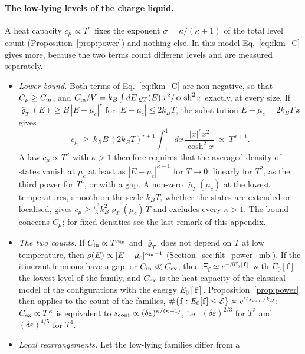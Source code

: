 \documentclass[10pt,a4paper]{article}
\theoremstyle{plain}
\newcommand{\enrg}{\mathcal{E}}  %
\begin{document}
\paragraph{The low-lying levels of the charge liquid.} A heat capacity
$c_\mu\propto T^{\kappa}$ fixes the exponent $\sigma=\kappa/(\kappa+1)$ of
the total level count (Proposition~\ref{prop:power}) and nothing else. In
this model Eq.~\eqref{eq:fkm_C} gives more, because the two terms count
different levels and are measured separately.
\begin{itemize}\setlength{\itemsep}{2pt}
\item \emph{Lower bound.} Both terms of Eq.~\eqref{eq:fkm_C} are
  non-negative, so that $C_\mu\ge C_{\rm in}$, and
  $C_{\rm in}/V=k_B\int dE\,\bar\varrho_T(E)\,x^{2}/\cosh^{2}x$ exactly, at
  every size. If $\bar\varrho_T(E)\ge B\,|E-\mu_c|^{r}$ for
  $|E-\mu_c|\le2k_BT$, the substitution $E-\mu_c=2k_BT\,x$ gives
  \[
    c_\mu\ \ge\ k_BB\,(2k_BT)^{r+1}\int_{-1}^{1}dx\,\frac{|x|^{r}x^{2}}{\cosh^{2}x}
    \ \propto\ T^{\,r+1} .
  \]
  A law $c_\mu\propto T^{\kappa}$ with $\kappa>1$ therefore requires that the
  averaged density of states vanish at $\mu_c$ at least as
  $|E-\mu_c|^{\kappa-1}$ for $T\to0$: linearly for $T^{2}$, as the third
  power for $T^{4}$, or with a gap. A non-zero $\bar\varrho_T(\mu_c)$ at the
  lowest temperatures, smooth on the scale $k_BT$, whether the states are
  extended or localised, gives
  $c_\mu\ge\tfrac{\pi^{2}}{3}k_B^{2}\bar\varrho_T(\mu_c)\,T$ and excludes
  every $\kappa>1$. The bound concerns $C_\mu$; for fixed densities see the
  last remark of this appendix.
\item \emph{The two counts.} If $C_{\rm in}\propto T^{\kappa_{\rm in}}$ and
  $\bar\varrho_T$ does not depend on $T$ at low temperature, then
  $\bar\varrho(E)\propto|E-\mu_c|^{\kappa_{\rm in}-1}$
  (Section~\ref{sec:filt_power_mb}). If the itinerant fermions have a gap,
  or $C_{\rm in}\ll C_{\rm ex}$, then
  $\Xi_{\mathbf f}\simeq e^{-\beta E_0[\mathbf f]}$ with $E_0[\mathbf f]$ the
  lowest level of the family, and $C_{\rm ex}$ is the heat capacity of the
  classical model of the configurations with the energy $E_0[\mathbf f]$.
  Proposition~\ref{prop:power} then applies to the count of the families,
  $\#\{\mathbf f:E_0[\mathbf f]\le\enrg\}\asymp e^{Vs_{\rm conf}/k_B}$:
  $C_{\rm ex}\propto T^{\kappa}$ is equivalent to
  $s_{\rm conf}\propto(\delta\varepsilon)^{\kappa/(\kappa+1)}$, i.e.\
  $(\delta\varepsilon)^{2/3}$ for $T^{2}$ and $(\delta\varepsilon)^{4/5}$ for
  $T^{4}$.
\item \emph{Local rearrangements.} Let the low-lying families differ from a

\end{itemize}
\end{document}
